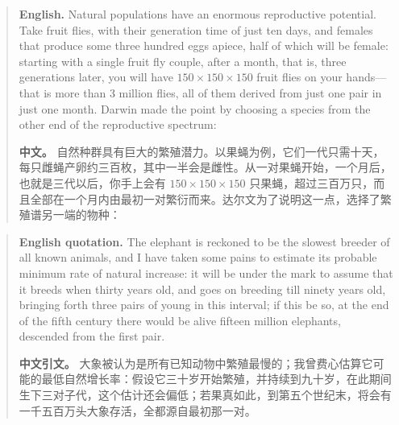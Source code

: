 \begin{quote}
\noindent\textbf{English.} Natural populations have an enormous reproductive potential. Take fruit flies, with their generation time of just ten days, and females that produce some three hundred eggs apiece, half of which will be female: starting with a single fruit fly couple, after a month, that is, three generations later, you will have \(150 \times 150 \times 150\) fruit flies on your hands---that is more than 3 million flies, all of them derived from just one pair in just one month. Darwin made the point by choosing a species from the other end of the reproductive spectrum:

\smallskip
\noindent\textbf{中文。} 自然种群具有巨大的繁殖潜力。以果蝇为例，它们一代只需十天，每只雌蝇产卵约三百枚，其中一半会是雌性。从一对果蝇开始，一个月后，也就是三代以后，你手上会有 \(150 \times 150 \times 150\) 只果蝇，超过三百万只，而且全部在一个月内由最初一对繁衍而来。达尔文为了说明这一点，选择了繁殖谱另一端的物种：
\end{quote}

\begin{quote}
\noindent\textbf{English quotation.} The elephant is reckoned to be the slowest breeder of all known animals, and I have taken some pains to estimate its probable minimum rate of natural increase: it will be under the mark to assume that it breeds when thirty years old, and goes on breeding till ninety years old, bringing forth three pairs of young in this interval; if this be so, at the end of the fifth century there would be alive fifteen million elephants, descended from the first pair.

\smallskip
\noindent\textbf{中文引文。} 大象被认为是所有已知动物中繁殖最慢的；我曾费心估算它可能的最低自然增长率：假设它三十岁开始繁殖，并持续到九十岁，在此期间生下三对子代，这个估计还会偏低；若果真如此，到第五个世纪末，将会有一千五百万头大象存活，全都源自最初那一对。
\end{quote}

